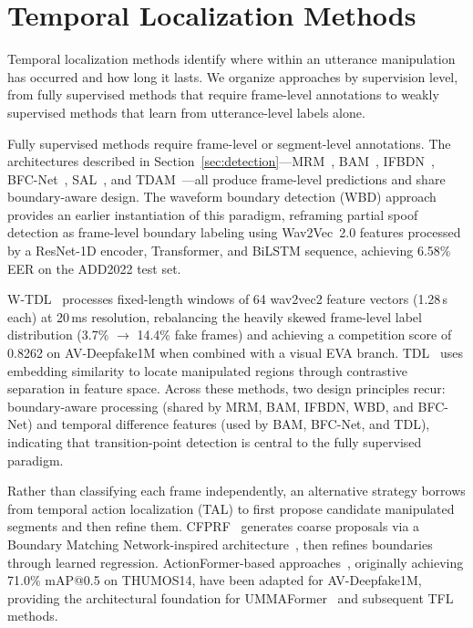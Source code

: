 \documentclass[journal]{IEEEtran}
\begin{document}
\section{Temporal Localization Methods}
\label{sec:localization}

Temporal localization methods identify where within an utterance manipulation has occurred and how long it lasts. We organize approaches by supervision level, from fully supervised methods that require frame-level annotations to weakly supervised methods that learn from utterance-level labels alone.

Fully supervised methods require frame-level or segment-level annotations. The architectures described in Section~\ref{sec:detection}---MRM~\cite{zhang2023partialspoof}, BAM~\cite{zhong2024bam}, IFBDN~\cite{cai2024ifbdn}, BFC-Net~\cite{zhou2025bfcnet}, SAL~\cite{sal2026}, and TDAM~\cite{li2025tdam}---all produce frame-level predictions and share boundary-aware design. The waveform boundary detection (WBD) approach~\cite{cai2023wbd} provides an earlier instantiation of this paradigm, reframing partial spoof detection as frame-level boundary labeling using Wav2Vec~2.0 features processed by a ResNet-1D encoder, Transformer, and BiLSTM sequence, achieving 6.58\% EER on the ADD2022 test set.

W-TDL~\cite{dragar2024wtdl} processes fixed-length windows of 64 wav2vec2 feature vectors (1.28\,s each) at 20\,ms resolution, rebalancing the heavily skewed frame-level label distribution (3.7\% $\rightarrow$ 14.4\% fake frames) and achieving a competition score of 0.8262 on AV-Deepfake1M when combined with a visual EVA branch. TDL~\cite{xie2024tdl} uses embedding similarity to locate manipulated regions through contrastive separation in feature space. Across these methods, two design principles recur: boundary-aware processing (shared by MRM, BAM, IFBDN, WBD, and BFC-Net) and temporal difference features (used by BAM, BFC-Net, and TDL), indicating that transition-point detection is central to the fully supervised paradigm.

Rather than classifying each frame independently, an alternative strategy borrows from temporal action localization (TAL) to first propose candidate manipulated segments and then refine them. CFPRF~\cite{wu2024cfprf} generates coarse proposals via a Boundary Matching Network-inspired architecture~\cite{lin2019bmn}, then refines boundaries through learned regression. ActionFormer-based approaches~\cite{zhang2022actionformer}, originally achieving 71.0\% mAP@0.5 on THUMOS14, have been adapted for AV-Deepfake1M, providing the architectural foundation for UMMAFormer~\cite{zhang2023ummaformer} and subsequent TFL methods.
\end{document}
